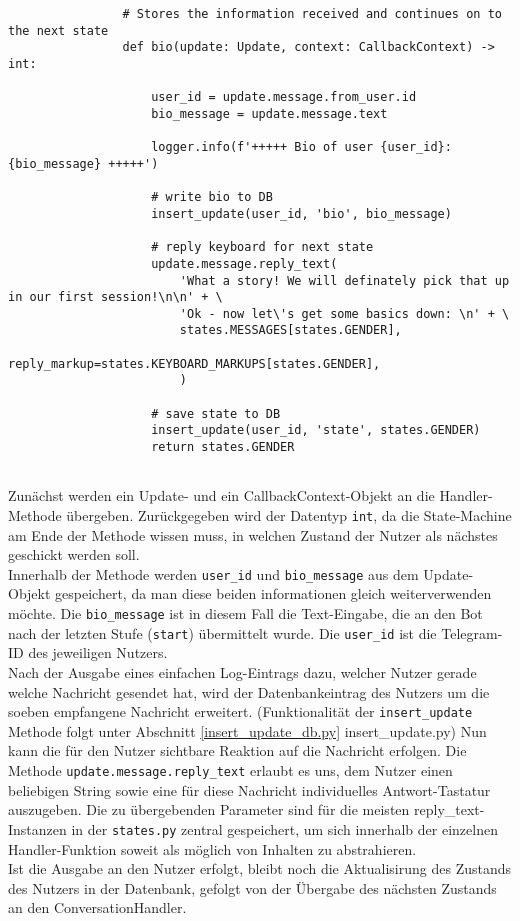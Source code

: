                 \begin{verbatim}
                # Stores the information received and continues on to the next state
                def bio(update: Update, context: CallbackContext) -> int:
                    
                    user_id = update.message.from_user.id
                    bio_message = update.message.text
                    
                    logger.info(f'+++++ Bio of user {user_id}: {bio_message} +++++')

                    # write bio to DB
                    insert_update(user_id, 'bio', bio_message)

                    # reply keyboard for next state
                    update.message.reply_text(
                        'What a story! We will definately pick that up in our first session!\n\n' + \
                        'Ok - now let\'s get some basics down: \n' + \
                        states.MESSAGES[states.GENDER],
                        reply_markup=states.KEYBOARD_MARKUPS[states.GENDER],
                        )

                    # save state to DB
                    insert_update(user_id, 'state', states.GENDER)
                    return states.GENDER
                
                \end{verbatim} 

                Zunächst werden ein Update- und ein CallbackContext-Objekt an die Handler-Methode übergeben. Zurückgegeben wird der Datentyp \verb|int|, da die State-Machine am Ende der Methode wissen muss, in welchen Zustand der Nutzer als nächstes geschickt werden soll. \\
                Innerhalb der Methode werden \verb|user_id| und \verb|bio_message| aus dem Update-Objekt gespeichert, da man diese beiden informationen gleich weiterverwenden möchte. Die \verb|bio_message| ist in diesem Fall die Text-Eingabe, die an den Bot nach der letzten Stufe (\verb|start|) übermittelt wurde. Die \verb|user_id| ist die Telegram-ID des jeweiligen Nutzers. \\
                Nach der Ausgabe eines einfachen Log-Eintrags dazu, welcher Nutzer gerade welche Nachricht gesendet hat, wird der Datenbankeintrag des Nutzers um die soeben empfangene Nachricht erweitert. (Funktionalität der \verb|insert_update| Methode folgt unter Abschnitt \ref{insert_update_db.py} insert\_update.py)
                Nun kann die für den Nutzer sichtbare Reaktion auf die Nachricht erfolgen. Die Methode \verb|update.message.reply_text| erlaubt es uns, dem Nutzer einen beliebigen String sowie eine für diese Nachricht individuelles Antwort-Tastatur auszugeben. Die zu übergebenden Parameter sind für die meisten reply\_text-Instanzen in der \verb|states.py| zentral gespeichert, um sich innerhalb der einzelnen Handler-Funktion soweit als möglich von Inhalten zu abstrahieren.\\
                Ist die Ausgabe an den Nutzer erfolgt, bleibt noch die Aktualisirung des Zustands des Nutzers in der Datenbank, gefolgt von der Übergabe des nächsten Zustands an den ConversationHandler.

